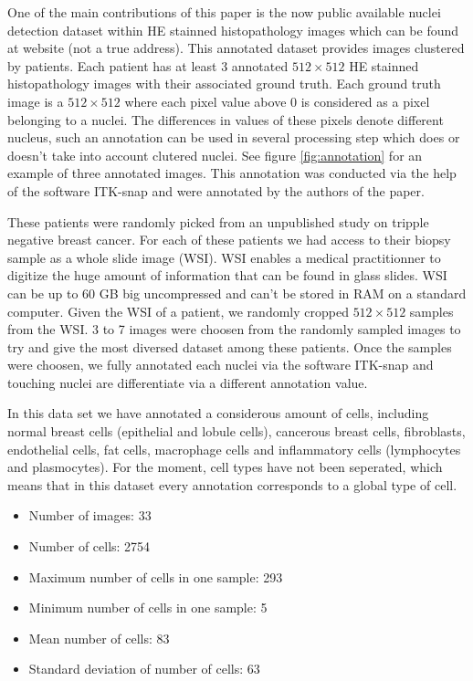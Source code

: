 \documentclass{article}
\begin{document}
One of the main contributions of this paper is the now public available 
nuclei detection dataset within HE stainned histopathology images which 
can be found at website %
(not a true address). This annotated dataset provides images clustered by 
patients. Each patient has at least 3 annotated $512 \times 512$ HE 
stainned histopathology images with their associated ground truth. Each 
ground truth image is a $512 \times 512$ where each pixel value above 
$0$ is considered as a pixel belonging to a nuclei. The differences in 
values of these pixels denote different nucleus, such an annotation can 
be used in several processing step which does or doesn't take into 
account clutered nuclei. See figure \ref{fig:annotation} for an example of 
three annotated images. This annotation was conducted via the help of 
the software ITK-snap and were annotated by the authors of the paper.


These patients were randomly picked from an unpublished study on
tripple negative breast cancer. For each of these patients we had access
to their biopsy sample as a whole slide image (WSI). WSI enables a
medical practitionner to digitize the huge amount of information that
can be found in glass slides. WSI can be up to 60 GB big
uncompressed and can't be stored in RAM on a standard computer. Given
the WSI of a patient, we randomly cropped $512 \times 512$ samples 
from the WSI. %
3 to 7 images were choosen from the randomly sampled images to try and give the most diversed dataset among these patients. Once the samples were choosen, we fully annotated each nuclei via the software ITK-snap and touching nuclei are differentiate via a different annotation value.

In this data set we have annotated a considerous amount of cells, 
including normal breast cells (epithelial and lobule cells),  cancerous 
breast cells, fibroblasts,  endothelial cells, fat cells, macrophage cells and 
inflammatory cells (lymphocytes and plasmocytes). For the moment, cell types have not been seperated, which means that in this dataset every annotation corresponds to a global type of cell. 

\begin{itemize}
\item Number of images: 33 \\
\item Number  of cells: 2754 \\
\item Maximum number of cells in one sample: 293 \\
\item Minimum number of cells in one sample: 5 \\
\item Mean number of cells: 83 \\
\item Standard deviation of number of cells: 63 \\
\end{itemize}
\end{document}
